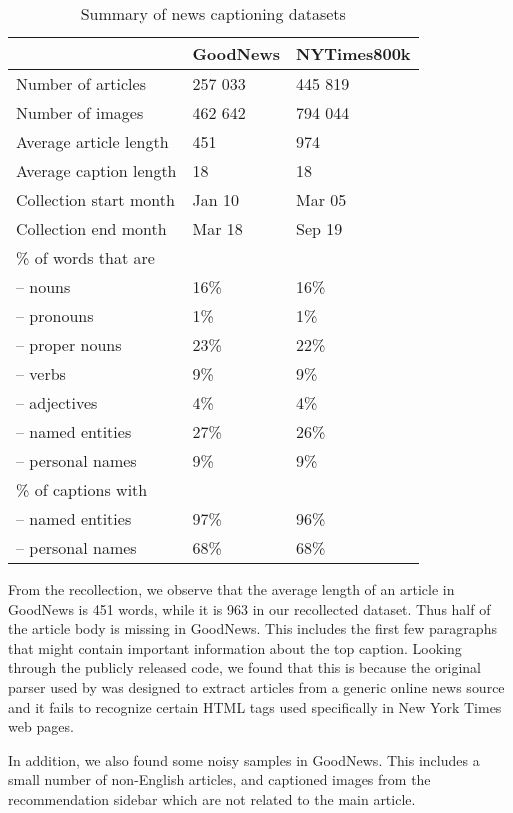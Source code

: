 \documentclass[10pt,twocolumn,letterpaper]{article}
\begin{document}
\begin{table}[t]
	\caption {Summary of news captioning datasets}
	\label{tab:datasets}
	\centering
	\begin{tabular}{lll}
		\toprule
		  & GoodNews  &   NYTimes800k \\
		\midrule
      Number of articles & 257 033 & 445 819 \\
      Number of images   & 462 642 & 794 044 \\
      Average article length & 451 & 974 \\
      Average caption length & 18 & 18 \\
      Collection start month & Jan 10 & Mar 05\\
      Collection end month & Mar 18 & Sep 19 \\
      \midrule
      \% of words that are \\
      \quad -- nouns & 16\% & 16\% \\
      \quad -- pronouns & 1\% & 1\% \\
      \quad -- proper nouns & 23\% & 22\% \\
      \quad -- verbs & 9\% & 9\%  \\
      \quad -- adjectives & 4\% & 4\% \\
      \quad -- named entities & 27\% & 26\% \\
      \quad -- personal names & 9\% & 9\% \\
      \midrule
      \% of captions with \\
      \quad -- named entities & 97\% & 96\% \\
      \quad -- personal names & 68\% & 68\% \\
		\bottomrule
	\end{tabular}
\end{table}

From the recollection, we observe that the average length of an article in
GoodNews is 451 words, while it is 963 in our recollected dataset. Thus half of
the article body is missing in GoodNews. This includes the first few paragraphs
that might contain important information about the top caption. Looking through
the publicly released code, we found that this is because the original parser
used by \cite{Biten2019GoodNews} was designed to extract articles from a
generic online news source and it fails to recognize certain HTML tags used
specifically in New York Times web pages.

In addition, we also found some noisy samples in GoodNews. This includes a
small number of non-English articles, and captioned images from the
recommendation sidebar which are not related to the main article.
\end{document}
